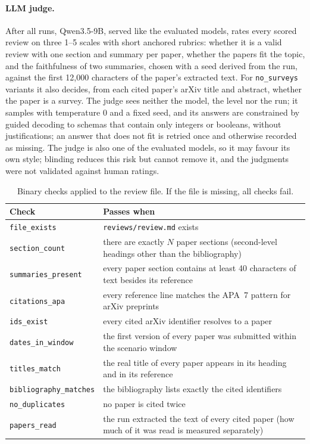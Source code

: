 \paragraph{LLM judge.} After all runs, Qwen3.5-9B, served like the evaluated models, rates every scored review on three 1--5 scales with short anchored rubrics: whether it is a valid review with one section and summary per paper, whether the papers fit the topic, and the faithfulness of two summaries, chosen with a seed derived from the run, against the first 12{,}000 characters of the paper's extracted text. For \texttt{no\_surveys} variants it also decides, from each cited paper's arXiv title and abstract, whether the paper is a survey. The judge sees neither the model, the level nor the run; it samples with temperature 0 and a fixed seed, and its answers are constrained by guided decoding to schemas that contain only integers or booleans, without justifications; an answer that does not fit is retried once and otherwise recorded as missing. The judge is also one of the evaluated models, so it may favour its own style; blinding reduces this risk but cannot remove it, and the judgments were not validated against human ratings.

\begin{table}[t]
  \caption{Binary checks applied to the review file. If the file is missing, all checks fail.}
  \label{tab:checks}
  \centering
  \small
  \begin{tabularx}{\linewidth}{@{}l>{\raggedright\arraybackslash}X@{}}
    \toprule
    Check & Passes when \\
    \midrule
    \texttt{file\_exists} & \texttt{reviews/review.md} exists \\
    \texttt{section\_count} & there are exactly $N$ paper sections (second-level headings other than the bibliography) \\
    \texttt{summaries\_present} & every paper section contains at least 40 characters of text besides its reference \\
    \texttt{citations\_apa} & every reference line matches the APA~7 pattern for arXiv preprints \\
    \texttt{ids\_exist} & every cited arXiv identifier resolves to a paper \\
    \texttt{dates\_in\_window} & the first version of every paper was submitted within the scenario window \\
    \texttt{titles\_match} & the real title of every paper appears in its heading and in its reference \\
    \texttt{bibliography\_matches} & the bibliography lists exactly the cited identifiers \\
    \texttt{no\_duplicates} & no paper is cited twice \\
    \texttt{papers\_read} & the run extracted the text of every cited paper (how much of it was read is measured separately) \\
    \bottomrule
  \end{tabularx}
\end{table}

